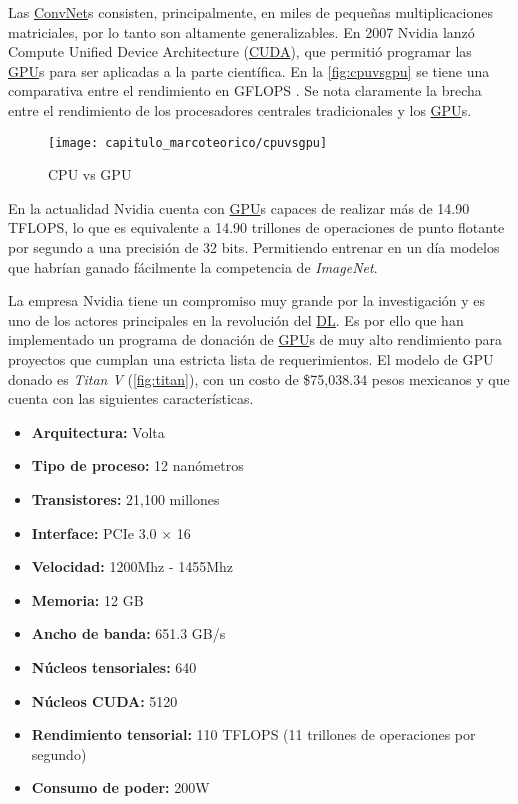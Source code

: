 Las \hyperlink{abbr}{ConvNet}s consisten, principalmente, en miles de pequeñas
multiplicaciones matriciales, por lo tanto son altamente generalizables. En 2007
Nvidia lanzó Compute Unified Device Architecture
(\hyperlink{abbr}{CUDA}), que permitió programar las \hyperlink{abbr}{GPU}s para ser
aplicadas a la parte científica. En la \autoref{fig:cpuvsgpu} se tiene una
comparativa entre el rendimiento en GFLOPS \cite{Nvidia} \cite{Nvidiaa}. Se nota
claramente la brecha entre el rendimiento de los procesadores centrales
tradicionales y los \hyperlink{abbr}{GPU}s.

\begin{figure}[H]
    \centering
    \texttt{[image: capitulo\_marcoteorico/cpuvsgpu]}
    \caption{CPU vs GPU}\label{fig:cpuvsgpu}
\end{figure}

En la actualidad Nvidia cuenta con \hyperlink{abbr}{GPU}s capaces de realizar
más de 14.90 TFLOPS, lo que es equivalente a 14.90 trillones de operaciones de
punto flotante por segundo a una precisión de 32 bits. Permitiendo entrenar en
un día modelos que habrían ganado fácilmente la competencia de \emph{ImageNet}.

La empresa Nvidia tiene un compromiso muy grande por la investigación y es uno
de los actores principales en la revolución del \hyperlink{abbr}{DL}. Es por
ello que han implementado un programa de donación de \hyperlink{abbr}{GPU}s de
muy alto rendimiento para proyectos que cumplan una estricta lista de
requerimientos. El modelo de GPU donado es \emph{Titan V} (\autoref{fig:titan}),
con un costo de \$75,038.34 pesos mexicanos y que cuenta con las siguientes
características.

\begin{itemize}
    \item{\textbf{Arquitectura:}} Volta
    \item{\textbf{Tipo de proceso:}} 12 nanómetros
    \item{\textbf{Transistores:}} 21,100 millones
    \item{\textbf{Interface:}} PCIe 3.0 $\times$ 16
    \item{\textbf{Velocidad:}} 1200Mhz - 1455Mhz
    \item{\textbf{Memoria:}} 12 GB
    \item{\textbf{Ancho de banda:}} 651.3 GB/s 
    \item{\textbf{Núcleos tensoriales:}} 640
    \item{\textbf{Núcleos CUDA:}} 5120
    \item{\textbf{Rendimiento tensorial:}} 110 TFLOPS (11 trillones de operaciones por segundo)
    \item{\textbf{Consumo de poder:}} 200W
\end{itemize}

